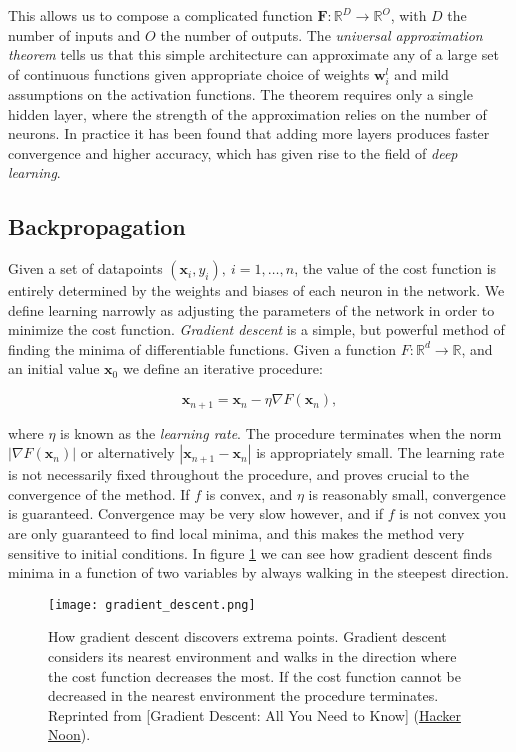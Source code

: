 This allows us to compose a complicated function $\bm{F}: \mathbb{R}^D \rightarrow
\mathbb{R}^O$, with $D$ the number of inputs and $O$ the number of outputs.
The \textit{universal approximation theorem}\cite{hornik1989multilayer}
tells us that this simple architecture
can approximate any of a large set of continuous functions
given appropriate choice of weights $\bm{w}_i^l$ and mild assumptions
on the activation functions.
The theorem requires only a single hidden layer,
where the strength of the approximation relies on the number of neurons.
In practice it has been found that adding more layers produces
faster convergence and higher accuracy, which has given rise
to the field of \textit{deep learning}.

\subsection{Backpropagation}
Given a set of datapoints $(\bm{x}_i, y_i), \ i=1,\dots,n$,
the value of the cost function is entirely determined
by the weights and biases of each neuron in the network.
We define learning narrowly as adjusting the parameters of the network
in order to minimize the cost function.
\textit{Gradient descent} is a simple, but powerful method
of finding the minima of differentiable functions.
Given a function $F: \mathbb{R}^d \rightarrow \mathbb{R}$, and an initial
value $\bm{x}_0$ we define an iterative procedure:

\begin{equation}
 \bm{x}_{n+1} = \bm{x}_{n} - \eta \nabla F(\bm{x}_n), 
\end{equation}

where $\eta$ is known as the \textit{learning rate}.
The procedure terminates when the norm
$ \left| \nabla F(\bm{x}_n) \right| $ or alternatively
$ \left| \bm{x}_{n+1} - \bm{x}_{n} \right| $
is appropriately small.
The learning rate is not necessarily fixed throughout the procedure,
and proves crucial to the convergence of the method. If $f$
is convex, and $\eta$ is reasonably small, convergence is guaranteed.
Convergence may be very slow however, and if $f$ is not convex
you are only guaranteed to find local minima, and this makes
the method very sensitive to initial conditions.
In figure \ref{fig:gradient-descent} we can see how gradient
descent finds minima in a function of two variables by always walking
in the steepest direction.

\begin{figure}[H]
    \centering
    \texttt{[image: gradient\_descent.png]}
    \caption{How gradient descent discovers extrema points.
    Gradient descent considers its nearest environment and walks
    in the direction where the cost function decreases the most.
    If the cost function cannot be decreased in the nearest environment
    the procedure terminates.
    Reprinted from [Gradient Descent: All You Need to Know] (\href{
        https://hackernoon.com/gradient-descent-aynk-7cbe95a778da}{Hacker Noon}).}
    \label{fig:gradient-descent}
\end{figure}

